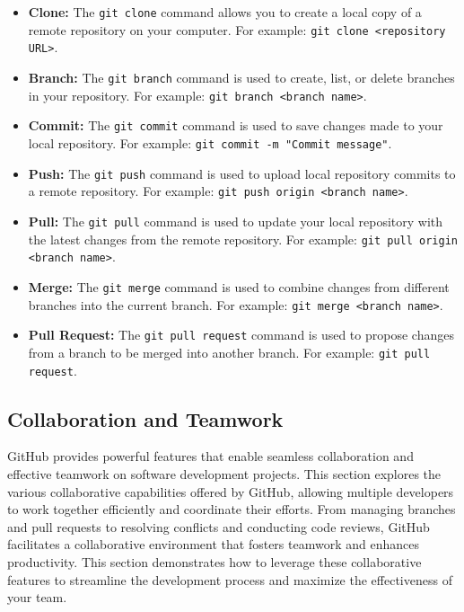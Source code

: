 \medskip \begin{itemize}
    \item \textbf{Clone:} The \texttt{git clone} command allows you to create a local copy of a remote repository on your computer. For example: \texttt{git clone <repository URL>}.
  
    \item \textbf{Branch:} The \texttt{git branch} command is used to create, list, or delete branches in your repository. For example: \texttt{git branch <branch name>}.
  
    \item \textbf{Commit:} The \texttt{git commit} command is used to save changes made to your local repository. For example: \texttt{git commit -m "Commit message"}.
  
    \item \textbf{Push:} The \texttt{git push} command is used to upload local repository commits to a remote repository. For example: \texttt{git push origin <branch name>}.
  
    \item \textbf{Pull:} The \texttt{git pull} command is used to update your local repository with the latest changes from the remote repository. For example: \texttt{git pull origin <branch name>}.
  
    \item \textbf{Merge:} The \texttt{git merge} command is used to combine changes from different branches into the current branch. For example: \texttt{git merge <branch name>}.
  
    \item \textbf{Pull Request:} The \texttt{git pull request} command is used to propose changes from a branch to be merged into another branch. For example: \texttt{git pull request}.
  \end{itemize}

  \subsection{Collaboration and Teamwork}
GitHub provides powerful features that enable seamless collaboration and effective teamwork on software development projects. This section explores the various collaborative capabilities offered by GitHub, allowing multiple developers to work together efficiently and coordinate their efforts. From managing branches and pull requests to resolving conflicts and conducting code reviews, GitHub facilitates a collaborative environment that fosters teamwork and enhances productivity. This section demonstrates how to leverage these collaborative features to streamline the development process and maximize the effectiveness of your team.   

